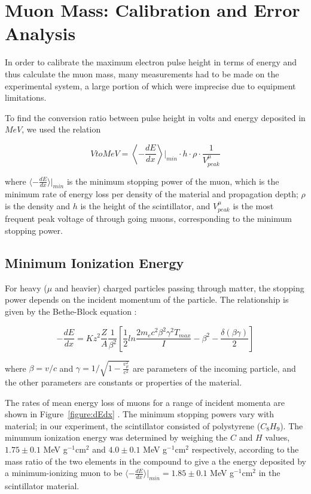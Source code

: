 
\section{Muon Mass: Calibration and Error Analysis}\label{masscalibration}

In order to calibrate the maximum electron pulse height in terms of
energy and thus calculate the muon mass, many measurements had to be
made on the experimental system, a large portion of which were
imprecise due to equipment limitations.

To find the conversion ratio between pulse height in volts and energy
deposited in $MeV$, we used the relation

\begin{equation} VtoMeV = \left\langle -\frac{dE}{dx}\right\rangle\left.\right|_{min} \cdot h\cdot\rho\cdot\frac{1}{V_{peak}^{\mu}}\end{equation}   

where $\langle -\frac{dE}{dx}\rangle|_{min}$ is the minimum stopping
power of the muon, which is the minimum rate of energy loss per
density of the material and propagation depth; $\rho$ is the density
and $h$ is the height of the scintillator, and $V_{peak}^{\mu}$ is the
most frequent peak voltage of through going muons, corresponding to
the minimum stopping power.

\subsection{Minimum Ionization Energy}\label{minimumionizationenergy}

For heavy ($\mu$ and heavier) charged particles passing through
matter, the stopping power depends on the incident momentum of the
particle. The relationship is given by the Bethe-Block equation
\cite{yao}:

\begin{equation}
-\frac{dE}{dx} = Kz^2\frac{Z}{A}\frac{1}{\beta^2}\left[\frac{1}{2}ln\frac{2m_ec^2\beta^2\gamma^2T_{max}}{I} - \beta^2 - \frac{\delta(\beta\gamma)}{2}\right]
\end{equation}

where $\beta = v/c$ and $\gamma = 1/\sqrt{1 - \frac{v_{\mu}^2}{c^2}}$
are parameters of the incoming particle, and the other parameters are
constants or properties of the material.

The rates of mean energy loss of muons for a range of incident momenta
are shown in Figure~\ref{figure:dEdx} \cite{yao}. The minimum stopping
powers vary with material; in our experiment, the scintillator
consisted of polystyrene ($C_8H_9$). The minumum ionization energy was
determined by weighing the $C$ and $H$ values, $1.75\pm 0.1$ MeV
g$^{-1}$cm$^{2}$ and $4.0\pm 0.1$ MeV g$^{-1}$cm$^{2}$ respectively,
according to the mass ratio of the two elements in the compound to
give a the energy deposited by a minimum-ionizing muon to be $\langle
-\frac{dE}{dx}\rangle|_{min}= 1.85 \pm 0.1$ MeV g$^{-1}$cm$^{2}$ in
the scintillator material.

